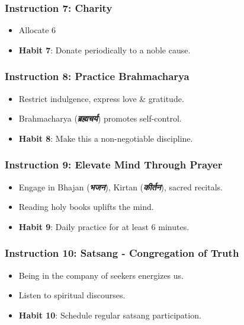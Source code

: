 \begin{frame}[fragile]\frametitle{Instruction 7: Charity}
      \begin{itemize}
          \item Allocate 6%
          \item \textbf{Habit 7}: Donate periodically to a noble cause.
      \end{itemize}
\end{frame}

\begin{frame}[fragile]\frametitle{Instruction 8: Practice Brahmacharya}
      \begin{itemize}
          \item Restrict indulgence, express love \& gratitude.
          \item Brahmacharya (\textbf{\textit{ब्रह्मचर्य}}) promotes self-control.
          \item \textbf{Habit 8}: Make this a non-negotiable discipline.
      \end{itemize}
\end{frame}

\begin{frame}[fragile]\frametitle{Instruction 9: Elevate Mind Through Prayer}
      \begin{itemize}
          \item Engage in Bhajan (\textbf{\textit{भजन}}), Kirtan (\textbf{\textit{कीर्तन}}), sacred recitals.
          \item Reading holy books uplifts the mind.
          \item \textbf{Habit 9}: Daily practice for at least 6 minutes.
      \end{itemize}
\end{frame}

\begin{frame}[fragile]\frametitle{Instruction 10: Satsang - Congregation of Truth}
      \begin{itemize}
          \item Being in the company of seekers energizes us.
          \item Listen to spiritual discourses.
          \item \textbf{Habit 10}: Schedule regular satsang participation.
      \end{itemize}
\end{frame}

